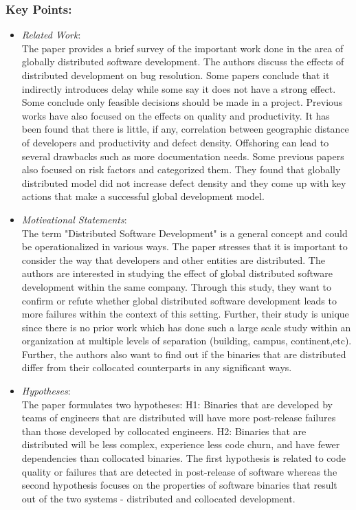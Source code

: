 \documentclass{sig-alternate-05-2015}
\begin{document}
\subsubsection{Key Points:}
\begin{itemize}
\item \emph{Related Work}: \\
The paper provides a brief survey of the important work done in the area of globally distributed software development. The authors discuss the effects of distributed development on bug resolution. Some papers conclude that it indirectly introduces delay while some say it does not have a strong effect. Some conclude only feasible decisions should be made in a project. Previous works have also focused on the effects on quality and productivity. It has been found that there is little, if any, correlation between geographic distance of developers and productivity and defect density. Offshoring can lead to several drawbacks such as more documentation needs. Some previous papers also focused on risk factors and categorized them. They found that globally distributed model did not increase defect density and they come up with key actions that make a successful global development model.
\item \emph{Motivational Statements}: \\
The term "Distributed Software Development" is a general concept and could be operationalized in various ways. The paper stresses that it is important to consider the way that developers and other entities are distributed. The authors are interested in studying the effect of global distributed software development within the same company. Through this study, they want to confirm or refute whether global distributed software development leads to more failures within the context of this setting. Further, their study is unique since there is no prior work which has done such a large scale study within an organization at multiple levels of separation (building, campus, continent,etc). Further, the authors also want to find out if the binaries that are distributed differ from their collocated counterparts in any significant ways.
\item \emph{Hypotheses}: \\
The paper formulates two hypotheses: H1: Binaries that are developed by teams of engineers that are distributed will have more post-release failures than those developed by collocated engineers. H2: Binaries that are distributed will be less complex, experience less code churn, and have fewer dependencies than collocated binaries. The first hypothesis is related to code quality or failures that are detected in post-release of software whereas the second hypothesis focuses on the properties of software binaries that result out of the two systems - distributed and collocated development.

\end{itemize}
\end{document}
